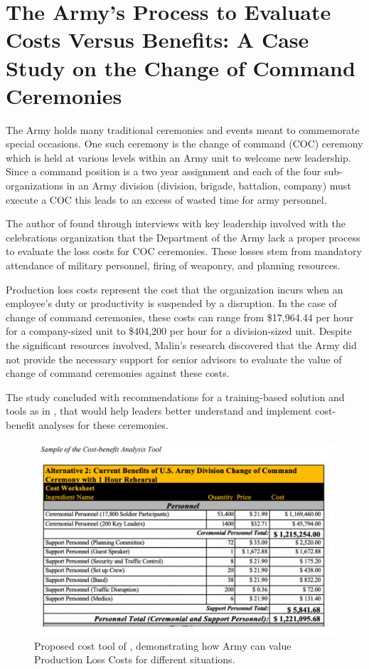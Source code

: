 \documentclass{article}
\begin{document}
		\section{The Army's Process to Evaluate Costs Versus Benefits: A Case Study on the Change of Command Ceremonies \cite{Malin2020}}

			The Army holds many traditional ceremonies and events meant to commemorate special occasions. 
			One such ceremony is the change of command (COC) ceremony which is held at various levels within an Army unit to welcome new leadership. 
			Since a command position is a two year assignment and each of the four sub-organizations in an Army division (division, brigade, battalion, company) must execute a COC this leads to an excess of wasted time for army personnel.

			The author of \cite{Malin2020} found through interviews with key leadership involved with the celebrations organization that the Department of the Army lack a proper process to evaluate the loss costs for COC ceremonies.
			These losses stem from mandatory attendance of military personnel, firing of weaponry, and planning resources.

			Production loss costs represent the cost that the organization incurs when an employee's duty or productivity is suspended by a disruption. In the case of change of command ceremonies, these costs can range from \$17,964.44 per hour for a company-sized unit to \$404,200 per hour for a division-sized unit. 
			Despite the significant resources involved, Malin's research discovered that the Army did not provide the necessary support for senior advisors to evaluate the value of change of command ceremonies against these costs.

			The study concluded with recommendations for a training-based solution and tools as in , that would help leaders better understand and implement cost-benefit analyses for these ceremonies. 
			
			\begin{figure}[htbp]
				\centering
				\includegraphics[width=0.4\linewidth,height=0.4\textheight,keepaspectratio]{figures/cost_tool.pdf}
				\caption{Proposed cost tool of \cite{Malin2020}, demonstrating how Army can value Production Loss Costs for different situations.}
				\label{fig:loss_tool}
			\end{figure}
\end{document}
